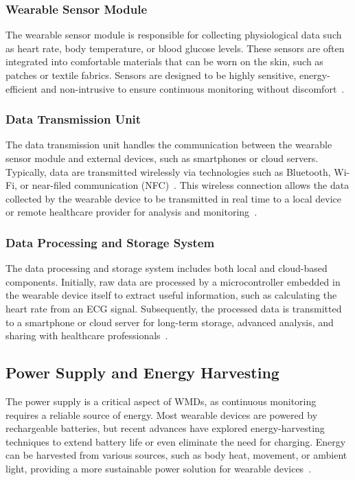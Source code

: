 \documentclass[journal]{IEEEtran}
\begin{document}
        \subsubsection{Wearable Sensor Module}
        
        The wearable sensor module is responsible for collecting physiological data such as heart rate, body temperature, or blood glucose levels. These sensors are often integrated into comfortable materials that can be worn on the skin, such as patches or textile fabrics. Sensors are designed to be highly sensitive, energy-efficient and non-intrusive to ensure continuous monitoring without discomfort~\cite{Saifuzzaman2021}.
        
        \subsubsection{Data Transmission Unit}
        
        The data transmission unit handles the communication between the wearable sensor module and external devices, such as smartphones or cloud servers. Typically, data are transmitted wirelessly via technologies such as Bluetooth, Wi-Fi, or near-filed communication (NFC)~\cite{Guk2019}. This wireless connection allows the data collected by the wearable device to be transmitted in real time to a local device or remote healthcare provider for analysis and monitoring~\cite{Nahavandi2022}.

        \subsubsection{Data Processing and Storage System}
        
        The data processing and storage system includes both local and cloud-based components. Initially, raw data are processed by a microcontroller embedded in the wearable device itself to extract useful information, such as calculating the heart rate from an ECG signal. Subsequently, the processed data is transmitted to a smartphone or cloud server for long-term storage, advanced analysis, and sharing with healthcare professionals~\cite{Veeravalli2017}.

    \subsection{Power Supply and Energy Harvesting}
    
    The power supply is a critical aspect of WMDs, as continuous monitoring requires a reliable source of energy. Most wearable devices are powered by rechargeable batteries, but recent advances have explored energy-harvesting techniques to extend battery life or even eliminate the need for charging. Energy can be harvested from various sources, such as body heat, movement, or ambient light, providing a more sustainable power solution for wearable devices~\cite{Ates2022}.
\end{document}
